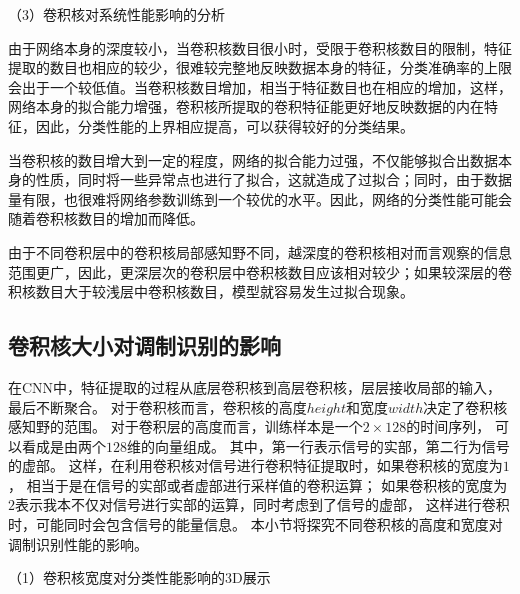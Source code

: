 （3）卷积核对系统性能影响的分析\par
由于网络本身的深度较小，当卷积核数目很小时，受限于卷积核数目的限制，特征提取的数目也相应的较少，很难较完整地反映数据本身的特征，分类准确率的上限会出于一个较低值。当卷积核数目增加，相当于特征数目也在相应的增加，这样，网络本身的拟合能力增强，卷积核所提取的卷积特征能更好地反映数据的内在特征，因此，分类性能的上界相应提高，可以获得较好的分类结果。\par
当卷积核的数目增大到一定的程度，网络的拟合能力过强，不仅能够拟合出数据本身的性质，同时将一些异常点也进行了拟合，这就造成了过拟合；同时，由于数据量有限，也很难将网络参数训练到一个较优的水平。因此，网络的分类性能可能会随着卷积核数目的增加而降低。\par

由于不同卷积层中的卷积核局部感知野不同，越深度的卷积核相对而言观察的信息范围更广，因此，更深层次的卷积层中卷积核数目应该相对较少；如果较深层的卷积核数目大于较浅层中卷积核数目，模型就容易发生过拟合现象。

\subsection{卷积核大小对调制识别的影响}
在CNN中，特征提取的过程从底层卷积核到高层卷积核，层层接收局部的输入，最后不断聚合。
对于卷积核而言，卷积核的高度$height$和宽度$width$决定了卷积核感知野的范围。
对于卷积层的高度而言，训练样本是一个$2\times128$的时间序列，
可以看成是由两个$128$维的向量组成。
其中，第一行表示信号的实部，第二行为信号的虚部。
这样，在利用卷积核对信号进行卷积特征提取时，如果卷积核的宽度为$1$，
相当于是在信号的实部或者虚部进行采样值的卷积运算；
如果卷积核的宽度为$2$表示我本不仅对信号进行实部的运算，同时考虑到了信号的虚部，
这样进行卷积时，可能同时会包含信号的能量信息。
本小节将探究不同卷积核的高度和宽度对调制识别性能的影响。\par

（1）卷积核宽度对分类性能影响的3D展示\par

